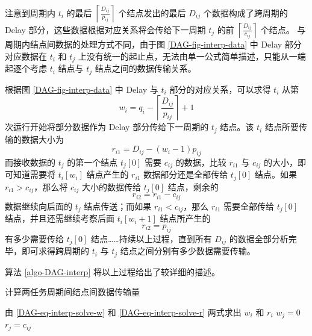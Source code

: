 注意到周期内 $t_i$ 的最后 $\left\lceil\frac{D_{ij}}{p_{ij}}\right\rceil$ 个结点发出的最后 $D_{ij}$ 个数据构成了跨周期的 Delay 部分，这些数据根据对应关系将会传给下一周期 $t_j$ 的前 $\left\lceil\frac{D_{ij}}{c_{ij}}\right\rceil$ 个结点。%
与周期内结点间数据的处理方式不同，由于图 \ref{DAG-fig-interp-data} 中 Delay 部分对应数据在 $t_i$ 和 $t_j$ 上没有统一的起止点，无法由单一公式简单描述，只能从一端起逐个考虑 $t_i$ 结点与 $t_j$ 结点之间的数据传输关系。

根据图 \ref{DAG-fig-interp-data} 中 Delay 与 $t_i$ 部分的对应关系，可以求得 $t_i$ 从第
\begin{equation}\label{DAG-eq-interp-solve-w}
  w_i=q_i-\left\lceil\frac{D_{ij}}{p_{ij}}\right\rceil+1
\end{equation}
次运行开始将部分数据作为 Delay 部分传给下一周期的 $t_j$ 结点。该 $t_i$ 结点所要传输的数据大小为
\begin{equation}\label{DAG-eq-interp-solve-r}
  r_{i1}=D_{ij}-(w_i-1)p_{ij}
\end{equation}
而接收数据的 $t_j$ 的第一个结点  $t_j[0]$  需要 $c_{ij}$ 的数据，比较 $r_{i1}$ 与 $c_{ij}$ 的大小，即可知道需要将 $t_i[w_i]$ 结点产生的 $r_{i1}$ 数据部分还是全部传给 $t_j[0]$ 结点。如果 $r_{i1}>c_{ij}$，那么将 $c_{ij}$ 大小的数据传给 $t_j[0]$ 结点，剩余的 $$r_{i2}=r_{i1}-c_{ij}$$ 数据继续向后面的 $t_j$ 结点传送；而如果 $r_{i1}<c_{ij}$，那么 $r_{i1}$ 需要全部传给 $t_j[0]$ 结点，并且还需继续考察后面 $t_i[w_i+1]$ 结点所产生的 $$r_{i2}=p_{ij}$$ 有多少需要传给 $t_j[0]$ 结点……持续以上过程，直到所有 $D_{ij}$ 的数据全部分析完毕，即可求得跨周期的 $t_i$ 与 $t_j$ 结点之间分别有多少数据需要传输。

算法 \ref{algo-DAG-interp} 将以上过程给出了较详细的描述。
\begin{algorithm}
  \caption{计算两任务周期间结点间数据传输量}
  \label{algo-DAG-interp}
  由 \eqref{DAG-eq-interp-solve-w} 和 \eqref{DAG-eq-interp-solve-r} 两式求出 $w_i$ 和 $r_i$\;
  $w_j=0$\;
  $r_j=c_{ij}$\;
\end{algorithm}

